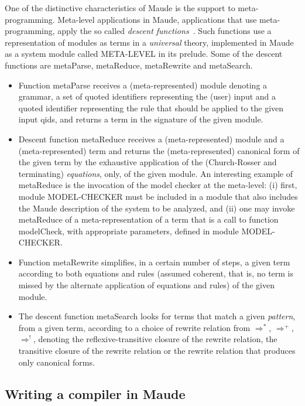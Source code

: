 \documentclass[a4paper,openany]{book}
\begin{document}
One of the distinctive characteristics of Maude is the support to meta-programming. Meta-level applications in Maude, applications that use meta-programming,  apply the so called \emph{descent functions}~\cite[Ch.14]{maude/2007}. Such functions use a representation of modules as terms in a \emph{universal} theory, implemented in Maude as a system module called META-LEVEL in its prelude. Some of the descent functions are metaParse, metaReduce, metaRewrite and metaSearch. 
\begin{itemize}
\item Function metaParse receives a (meta-represented) module denoting a grammar, a set of quoted identifiers representing the (user) input and a quoted identifier representing the rule that should be applied to the given input qids, and returns a term in the signature of the given module. 
\item Descent function metaReduce receives a (meta-represented) module and a (meta-represented) term and returns the (meta-represented) canonical form of the given term by the exhaustive application of the (Church-Rosser and terminating) \emph{equations}, only, of the given module.  An interesting example of metaReduce is the invocation of the model checker at the meta-level: (i) first, module MODEL-CHECKER must be included in a module that also includes the Maude description of the system to be analyzed, and (ii) one may invoke metaReduce of a meta-representation of a term that is a call to function modelCheck, with appropriate parameters, defined in module MODEL-CHECKER. 
\item Function metaRewrite simplifies, in a certain number of steps, a given term according to both equations and rules (assumed coherent, that is, no term is missed by the alternate application of equations and rules) of the given module. 
\item The descent function metaSearch looks for terms that match a given \emph{pattern}, from a given term, according to a choice of rewrite relation from $\Rightarrow^*$, $\Rightarrow^+$, $\Rightarrow^!$, denoting the reflexive-transitive closure of the rewrite relation, the transitive closure of the rewrite relation or the rewrite relation that produces only canonical forms.
\end{itemize}

\subsection{Writing a compiler in Maude}\label{sec:comp-in-maude} 
\end{document}
